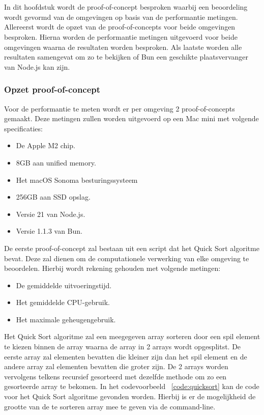 
\chapter{}%
\label{ch:proof-of-concept}

In dit hoofdstuk wordt de proof-of-concept besproken 
waarbij een beoordeling wordt gevormd van de omgevingen op basis van de performantie metingen.
Allereerst wordt de opzet van de proof-of-concepts voor beide omgevingen besproken.
Hierna worden de performantie metingen uitgevoerd voor beide omgevingen waarna de resultaten worden besproken.
Als laatste worden alle resultaten samengevat om zo te bekijken of Bun een geschikte plaatsvervanger van Node.js kan zijn.

\subsection{Opzet proof-of-concept}
Voor de performantie te meten wordt er per omgeving 2 proof-of-concepts gemaakt. 
Deze metingen zullen worden uitgevoerd op een Mac mini met volgende specificaties:
\begin{itemize}
  \item De Apple M2 chip.
  \item 8GB aan unified memory.
  \item Het macOS Sonoma besturingssysteem
  \item 256GB aan SSD opslag.
  \item Versie 21 van Node.js.
  \item Versie 1.1.3 van Bun.
\end{itemize}
De eerste proof-of-concept zal bestaan uit een script dat het Quick Sort algoritme bevat. 
Deze zal dienen om de computationele verwerking van elke omgeving te beoordelen. Hierbij wordt rekening gehouden met volgende metingen:
\begin{itemize}
    \item De gemiddelde uitvoeringstijd.
    \item Het gemiddelde CPU-gebruik.
    \item Het maximale geheugengebruik.
\end{itemize}
Het Quick Sort algoritme zal een meegegeven array sorteren door een spil element te kiezen binnen de array
waarna de array in 2 arrays wordt opgesplitst. De eerste array zal elementen bevatten die kleiner zijn dan het spil element 
en de andere array zal elementen bevatten die groter zijn. 
De 2 arrays worden vervolgens telkens recursief gesorteerd met dezelfde methode om zo een gesorteerde array te bekomen.
In het codevoorbeeld ~\ref{code:quicksort} kan de code voor het Quick Sort algoritme gevonden worden.
Hierbij is er de mogelijkheid de grootte van de te sorteren array mee te geven via de command-line.

